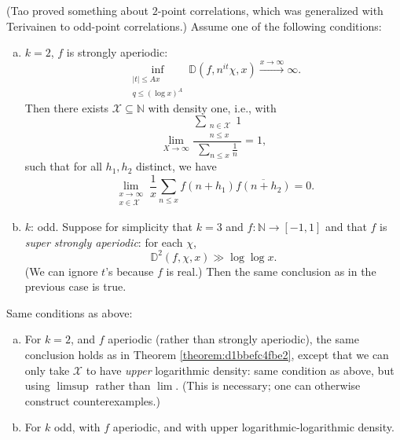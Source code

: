 \documentclass[reqno]{amsart} 
\begin{document}
\begin{theorem}\label{theorem:d1bbefc4fbe2}
  (Tao proved something about $2$-point correlations, which was generalized with Terivainen to odd-point correlations.)  Assume one of the following conditions:
  \begin{enumerate}[(a)]
  \item $k = 2$, $f$ is strongly aperiodic:
    \begin{equation*}
      \inf_{
        \substack{
          \lvert t \rvert \leq A x  \\
          q \leq (\log x )^A 
        }
      }
      \mathbb{D} (f, n^{i t } \chi, x) \xrightarrow{x \rightarrow \infty } \infty.
    \end{equation*}
    Then there exists $\mathcal{X} \subseteq \mathbb{N}$ with density one, i.e., with
    \begin{equation*}
      \lim_{X \rightarrow \infty } \frac{\sum_{
          \substack{
            n \in \mathcal{X}   \\
            n \leq x
          }
        }
        1
      }{
        \sum_{n \leq x} \frac{1}{ n}
      }
      =
      1,
    \end{equation*}
    such that for all $h_1, h_2$ distinct, we have
    \begin{equation*}
      \lim_{
        \substack{
          x \rightarrow \infty  \\
          x \in \mathcal{X} 
        }
      }  \frac{1}{x}
      \sum_{
        n \leq x
      }
      f (n + h_1 ) \overline{f (n + h_2 )} = 0.
    \end{equation*}
  \item $k$: odd.  Suppose for simplicity that $ k = 3$ and $f : \mathbb{N} \rightarrow [-1, 1]$ and that $f$ is \emph{super strongly aperiodic}: for each $\chi$,
    \begin{equation*}
      \mathbb{D}^2 (f, \chi, x)
      \gg
      \log \log x.
    \end{equation*}
    (We can ignore $t$'s because $f$ is real.)  Then the same conclusion as in the previous case is true.
  \end{enumerate}
\end{theorem}

\begin{theorem}[KMT, 2023]
  Same conditions as above:
  \begin{enumerate}[(a)]
  \item For $k = 2$, and $f$ aperiodic (rather than strongly aperiodic), the same conclusion holds as in Theorem \ref{theorem:d1bbefc4fbe2}, except that we can only take $\mathcal{X}$ to have \emph{upper} logarithmic density: same condition as above, but using $\limsup$ rather than $\lim$.  (This is necessary; one can otherwise construct counterexamples.)
  \item For $k$ odd, with $f$ aperiodic, and with upper logarithmic-logarithmic density.
  \end{enumerate}
\end{theorem}
\end{document}
